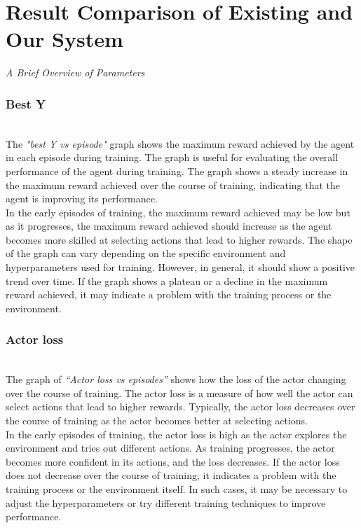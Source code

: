 \documentclass[preprint,12pt]{elsarticle}
\begin{document}
\section{Result Comparison of Existing and Our System}
\textit{A Brief Overview of Parameters}\\


\subsubsection{Best Y}\\
The \textit{"best Y vs episode" }graph shows the maximum reward achieved by the agent in each episode during training. The graph is useful for evaluating the overall performance of the agent during training. The graph shows a steady increase in the maximum reward achieved over the course of training, indicating that the agent is improving its performance.\\

In the early episodes of training, the maximum reward achieved may be low but as it progresses, the maximum reward achieved should increase as the agent becomes more skilled at selecting actions that lead to higher rewards.
The shape of the graph can vary depending on the specific environment and hyperparameters used for training. However, in general, it should show a positive trend over time. If the graph shows a plateau or a decline in the maximum reward achieved, it may indicate a problem with the training process or the environment. \\

\subsubsection{Actor loss}\\
The graph of \textit{“Actor loss vs episodes” } shows how the loss of the actor changing over the course of training. The actor loss is a measure of how well the actor can select actions that lead to higher rewards. Typically, the actor loss decreases over the course of training as the actor becomes better at selecting actions.\\
In the early episodes of training, the actor loss is high as the actor explores the environment and tries out different actions. As training progresses, the actor becomes more confident in its actions, and the loss decreases. If the actor loss does not decrease over the course of training, it indicates a problem with the training process or the environment itself. In such cases, it may be necessary to adjust the hyperparameters or try different training techniques to improve performance.\\
\end{document}
